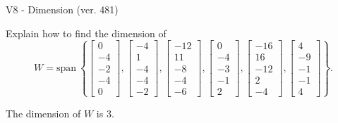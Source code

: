 \begin{exercise}
  \begin{exerciseTitle}V8 - Dimension (ver. 481)\end{exerciseTitle}
  \begin{exerciseStatement}
    Explain how to find the dimension of 
\[W=\mathrm{span}\ \left\{\left[\begin{array}{r}
0 \\
-4 \\
-2 \\
-4 \\
0
\end{array}\right] , \left[\begin{array}{r}
-4 \\
1 \\
-4 \\
-4 \\
-2
\end{array}\right] , \left[\begin{array}{r}
-12 \\
11 \\
-8 \\
-4 \\
-6
\end{array}\right] , \left[\begin{array}{r}
0 \\
-4 \\
-3 \\
-1 \\
2
\end{array}\right] , \left[\begin{array}{r}
-16 \\
16 \\
-12 \\
2 \\
-4
\end{array}\right] , \left[\begin{array}{r}
4 \\
-9 \\
-1 \\
-1 \\
4
\end{array}\right]\right\}.\]



  \end{exerciseStatement}
  \begin{exerciseAnswer}
   The dimension of \(W\) is  \(3\).
  


  \end{exerciseAnswer}
\end{exercise}